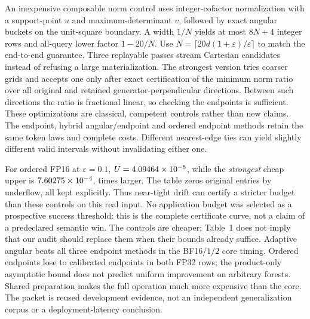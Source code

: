 \documentclass[11pt]{article}
\begin{document}
An inexpensive composable norm control uses integer-cofactor normalization
with a support-point $u$ and maximum-determinant $v$, followed by exact angular
buckets on the unit-square boundary. A width $1/N$ yields at most $8N+4$
integer rows and all-query lower factor $1-20/N$. Use
$N=\lceil20d(1+\varepsilon)/\varepsilon\rceil$ to match the end-to-end guarantee.
Three replayable passes stream Cartesian candidates instead of refusing a
large materialization. The strongest version tries coarser grids and accepts
one only after exact certification of the minimum norm ratio over all original
and retained generator-perpendicular directions. Between such directions the
ratio is fractional linear, so checking the endpoints is sufficient.
These optimizations are classical, competent controls rather than new claims.
The endpoint, hybrid angular/endpoint and ordered endpoint methods retain
the same token laws and complete costs. Different nearest-edge ties can
yield slightly different valid intervals without invalidating either one.

\begin{table}[p]
\centering\scriptsize

\caption{All 24 predefined functional audits from producer \AuditProducer.
W/C means wall/CPU seconds. Full cost includes input verification, preparation,
both normalizers, rounding and strong scalar controls; no model execution is
measured. One execution per row, not an independent/statistical speed gate.
Rational source rows generate every displayed interval and cheap bound.}
\end{table}

For ordered FP16 at $\varepsilon=0.1$, $U=4.09464\times10^{-5}{}$, while the
\emph{strongest} cheap upper is $7.60275\times10^{-4}{}$, \CheapFactor{} times larger.
The table zeros
\FPsixteenZeros{} original entries by underflow, all kept explicitly.
Thus near-tight drift can certify a stricter budget than these controls on
this real input. No application budget was selected as a prospective success
threshold: this is the complete certificate curve, not a claim of a
predeclared semantic win. The controls are cheaper; Table~1 does not imply
that our audit should replace them when their bounds already suffice.
Adaptive angular beats all three endpoint methods in the BF16/$1/2$ core
timing. Ordered endpoints lose to calibrated endpoints in both FP32 rows;
the product-only asymptotic bound does not predict uniform improvement on
arbitrary forests. Shared preparation makes the full operation much more
expensive than the core. The packet is reused development evidence, not an
independent generalization corpus or a deployment-latency conclusion.
\end{document}
